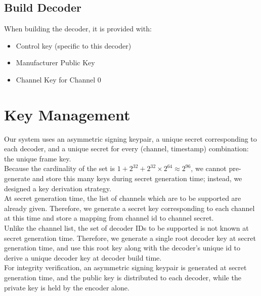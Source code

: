 \documentclass[12pt]{article}
\begin{document}
\subsection*{Build Decoder}
When building the decoder, it is provided with:
\begin{itemize}
  \item Control key (specific to this decoder)
  \item Manufacturer Public Key
  \item Channel Key for Channel 0
\end{itemize}

\vspace{1cm}

\section*{Key Management}
Our system uses an asymmetric signing keypair, a unique secret corresponding to each decoder, and a unique secret for every (channel, timestamp) combination: the unique frame key.\\
Because the cardinality of the set is $1 + 2^{32} + 2^{32}\times2^{64} \approx 2^{96}$, we cannot pre-generate and store this many keys during secret generation time; instead, we designed a key derivation strategy.\\
At secret generation time, the list of channels which are to be supported are already given. Therefore, we generate a secret key corresponding to each channel at this time and store a mapping from channel id to channel secret.\\
Unlike the channel list, the set of decoder IDs to be supported is not known at secret generation time. Therefore, we generate a single root decoder key at secret generation time, and use this root key along with the decoder's unique id to derive a unique decoder key at decoder build time.\\
For integrity verification, an asymmetric signing keypair is generated at secret generation time, and the public key is distributed to each decoder, while the private key is held by the encoder alone.\\
\end{document}
